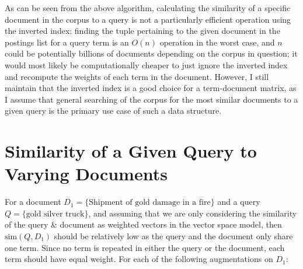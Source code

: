 \documentclass[a4paper]{article}
\begin{document}
As can be seen from the above algorithm, calculating the similarity of a specific document in the corpus to a query is not a particularly efficient operation using the inverted index: finding the tuple pertaining to the given document in the postings list for a query term is an $O(n)$ operation in the worst case, and $n$ could be potentially billions of documents depending on the corpus in question;
it would most likely be computationally cheaper to just ignore the inverted index and recompute the weights of each term in the document.
However, I still maintain that the inverted index is a good choice for a term-document matrix, as I assume that general searching of the corpus for the most similar documents to a given query is the primary use case of such a data structure.

\section{Similarity of a Given Query to Varying Documents}
For a document $D_1 = \{ \text{Shipment of gold damage in a fire} \}$ and a query $Q = \{ \text{gold silver truck} \}$,
and assuming that we are only considering the similarity of the query \& document as weighted vectors in the vector space model, then $\text{sim}(Q, D_1)$ should be relatively low as the query and the document only share one term.
Since no term is repeated in either the query or the document, each term should have equal weight.
For each of the following augmentations on $D_1$:
\end{document}
